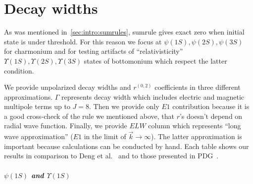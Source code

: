 \chapter{Decay widths}

As was mentioned in~\cref{sec:intro:sumrules}, sumrule gives exact zero when initial state is under threshold. For this reason we focus at $\psi(1S),\psi(2S),\psi(3S)$ for charmonium and for testing artifacts of ``relativisticity'' $\Upsilon(1S),\Upsilon(2S),\Upsilon(3S)$ states of bottomonium which respect the latter condition.

We provide unpolarized decay widths and $r^{(0,2)}$ coefficients in three different approximations. $\Gamma$ represents decay width which includes electric and magnetic multipole terms up to $J=8$. Then we provide only $E1$ contribution because it is a good cross-check of the rule we mentioned above, that $r$'s doesn't depend on radial wave function. Finally, we provide $ELW$ column which represents ``long wave approximation'' ($E1$ in the limit of $\vec{k} \rightarrow \infty$). The latter approximation is important because calculations can be conducted by hand. Each table shows our results in comparison to Deng et al.~\cite{deng-charm,deng-bot} and to those presented in PDG~\cite{pdg}.

\paragraph{$\psi(1S)$ and $\Upsilon(1S)$}


